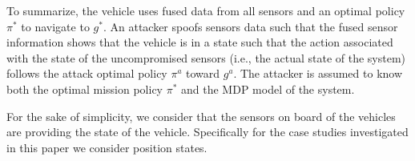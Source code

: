 \documentclass[letterpaper, 10 pt, conference]{ieeeconf}  %
\newcommand\NB[1]{$\spadesuit$\footnote{NB: #1}}
\begin{document}
To summarize, the vehicle uses fused data from all sensors and an optimal policy $\pi^*$ to navigate to $g^*$. An attacker spoofs sensors data such that the fused sensor information shows that the vehicle is in a state such that the action associated with the state of the uncompromised sensors (i.e., the actual state of the system) follows the attack optimal policy $\pi^a$ toward $g^a$. The attacker is assumed to know both the optimal mission policy $\pi^*$ and the MDP model of the system.   

For the sake of simplicity, we consider that the sensors on board of the vehicles are providing the state of the vehicle. Specifically for the case studies investigated in this paper we consider position states.

\end{document}
